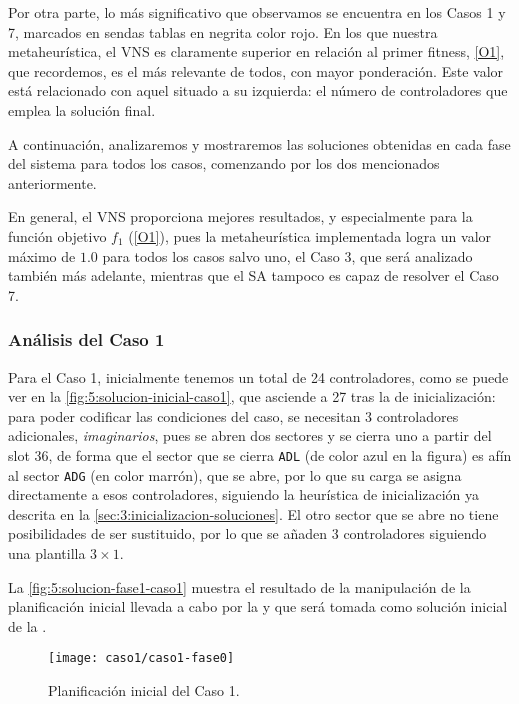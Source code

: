 Por otra parte, lo más significativo que observamos se encuentra en los Casos 1 y 7, marcados en sendas tablas en negrita color rojo. En los que nuestra metaheurística, el VNS es claramente superior en relación al primer fitness, \ref{O1}, que recordemos, es el más relevante de todos, con mayor ponderación. Este valor está relacionado con aquel situado a su izquierda: el número de controladores que emplea la solución final. 

A continuación, analizaremos y mostraremos las soluciones obtenidas en cada fase del sistema para todos los casos, comenzando por los dos mencionados anteriormente.

En general, el VNS proporciona mejores resultados, y especialmente para la función objetivo $f_1$ (\ref{O1}), pues la metaheurística implementada logra un valor máximo de $1.0$ para todos los casos salvo uno, el Caso 3, que será analizado también más adelante, mientras que el SA tampoco es capaz de resolver el Caso 7. %

\subsubsection{Análisis del Caso 1}

Para el Caso 1, inicialmente tenemos un total de 24 controladores, como se puede ver en la \autoref{fig:5:solucion-inicial-caso1}, que asciende a 27 tras la \faseuno{} de inicialización: para poder codificar las condiciones del caso, se necesitan 3 controladores adicionales, \textit{imaginarios}, pues se abren dos sectores y se cierra uno a partir del slot 36, de forma que el sector que se cierra \texttt{ADL} (de color azul en la figura) es afín al sector \texttt{ADG} (en color marrón), que se abre, por lo que su carga se asigna directamente a esos controladores, siguiendo la heurística de inicialización ya descrita en la \autoref{sec:3:inicializacion-soluciones}. El otro sector que se abre no tiene posibilidades de ser sustituido, por lo que se añaden 3 controladores siguiendo una plantilla $3\times1$.

La \autoref{fig:5:solucion-fase1-caso1} muestra el resultado de la manipulación de la planificación inicial llevada a cabo por la \faseuno{} y que será tomada como solución inicial de la \fasedos{}.

\begin{figure}
	\centering
	\texttt{[image: caso1/caso1-fase0]}
	\caption{Planificación inicial del Caso 1.}
	\label{fig:5:solucion-inicial-caso1}
\end{figure}

